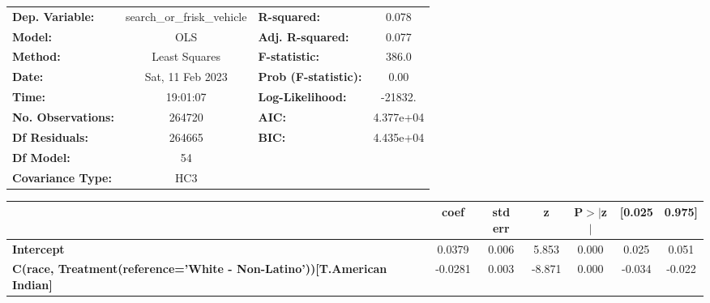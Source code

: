\begin{center}
\begin{tabular}{lclc}
\toprule
\textbf{Dep. Variable:}                                                           & search\_or\_frisk\_vehicle & \textbf{  R-squared:         } &     0.078   \\
\textbf{Model:}                                                                   &            OLS             & \textbf{  Adj. R-squared:    } &     0.077   \\
\textbf{Method:}                                                                  &       Least Squares        & \textbf{  F-statistic:       } &     386.0   \\
\textbf{Date:}                                                                    &      Sat, 11 Feb 2023      & \textbf{  Prob (F-statistic):} &     0.00    \\
\textbf{Time:}                                                                    &          19:01:07          & \textbf{  Log-Likelihood:    } &   -21832.   \\
\textbf{No. Observations:}                                                        &           264720           & \textbf{  AIC:               } & 4.377e+04   \\
\textbf{Df Residuals:}                                                            &           264665           & \textbf{  BIC:               } & 4.435e+04   \\
\textbf{Df Model:}                                                                &               54           & \textbf{                     } &             \\
\textbf{Covariance Type:}                                                         &            HC3             & \textbf{                     } &             \\
\bottomrule
\end{tabular}
\begin{tabular}{lcccccc}
                                                                                  & \textbf{coef} & \textbf{std err} & \textbf{z} & \textbf{P$> |$z$|$} & \textbf{[0.025} & \textbf{0.975]}  \\
\midrule
\textbf{Intercept}                                                                &       0.0379  &        0.006     &     5.853  &         0.000        &        0.025    &        0.051     \\
\textbf{C(race, Treatment(reference='White - Non-Latino'))[T.American Indian]}    &      -0.0281  &        0.003     &    -8.871  &         0.000        &       -0.034    &       -0.022     \\

\end{tabular}
\end{center}
